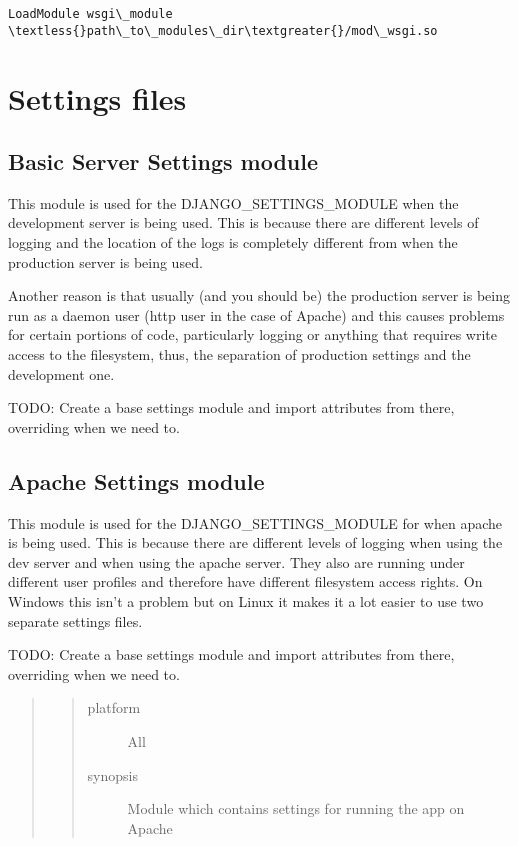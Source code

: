 \documentclass[letterpaper,10pt,english]{sphinxmanual}
\begin{document}
\begin{Verbatim}[commandchars=\\\{\}]
LoadModule wsgi\_module \textless{}path\_to\_modules\_dir\textgreater{}/mod\_wsgi.so
\end{Verbatim}


\section{Settings files}
\label{settings:settings-files}\label{settings::doc}

\subsection{Basic Server Settings module}
\label{settings:basic-server-settings-module}\label{settings:module-timetracker.settings}
This module is used for the DJANGO\_SETTINGS\_MODULE when the development server
is being used. This is because there are different levels of logging and the
location of the logs is completely different from when the production server
is being used.

Another reason is that usually (and you should be) the production server is
being run as a daemon user (http user in the case of Apache) and this causes
problems for certain portions of code, particularly logging or anything that
requires write access to the filesystem, thus, the separation of production
settings and the development one.

TODO: Create a base settings module and import attributes from there,
overriding when we need to.


\subsection{Apache Settings module}
\label{settings:module-timetracker.apache_settings}\label{settings:apache-settings-module}
This module is used for the DJANGO\_SETTINGS\_MODULE for when apache is being
used. This is because there are different levels of logging when using the dev
server and when using the apache server. They also are running under different
user profiles and therefore have different filesystem access rights. On
Windows this isn't a problem but on Linux it makes it a lot easier to use two
separate settings files.

TODO: Create a base settings module and import attributes from there,
overriding when we need to.
\begin{quote}
\begin{quote}\begin{description}
\item[{platform}] \leavevmode
All

\item[{synopsis}] \leavevmode
Module which contains settings for running the app on Apache

\end{description}\end{quote}
\end{quote}
\end{document}

